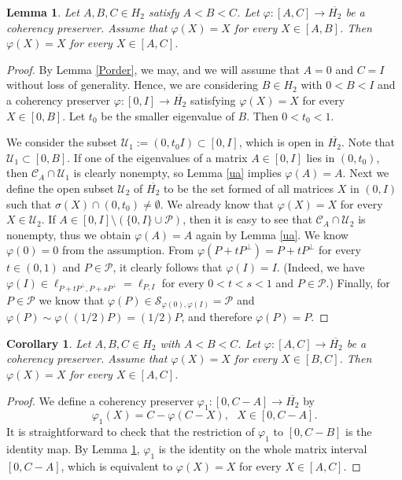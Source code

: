 \documentclass[10pt,a4paper]{amsart}
\newcommand\cP{{\mathcal{P}}}
\newcommand\oH{{\overline{H_2}}}
\newtheorem{lemma}[theorem]{Lemma}
\newtheorem{corollary}[theorem]{Corollary}
\theoremstyle{definition}
\theoremstyle{remark}
\numberwithin{subsection}{section}
\numberwithin{equation}{section}
\begin{document}
\begin{lemma}\label{smtq}
Let $A,B,C \in H_2$ satisfy $A < B < C$. Let $\varphi \colon [A,C ] \to \oH$ be a coherency preserver. Assume that $\varphi (X) = X$ for every $X \in [A,B]$. Then $\varphi (X) = X$ for every $X \in [A,C]$.
\end{lemma}
\begin{proof}
By Lemma \ref{Porder}, we may, and we will assume that $A=0$ and $C= I$ without loss of generality.
Hence, we are considering $B \in H_2$ with $0 < B <  I$ and a coherency preserver $\varphi \colon [0,I ] \to \oH$ satisfying $\varphi (X) = X$ for every $X \in [0,B]$.
Let $t_0$ be the smaller eigenvalue of $B$. Then $0 < t_0 <1$. 

We consider the subset $\mathcal{U}_1:=(0, t_0I)\subset [0, I]$, which is open in $\oH$. 
Note that $\mathcal{U}_1\subset [0,B]$.
If one of the eigenvalues of a matrix $A\in [0, I]$ lies in $(0, t_0)$, then $\mathcal{C}_A\cap \mathcal{U}_1$ is clearly nonempty, so Lemma \ref{ua} implies $\varphi(A)=A$. 
Next we define the open subset $\mathcal{U}_2$ of $\oH$ to be the set formed of all matrices $X$ in $(0, I)$ such that $\sigma(X)\cap (0, t_0)\neq \emptyset$.
We already know that $\varphi(X)=X$ for every $X\in \mathcal{U}_2$. 
If $A\in [0, I]\setminus (\{0, I\} \cup \mathcal{P})$, then it is easy to see that $\mathcal{C}_A\cap \mathcal{U}_2$ is nonempty, thus we obtain $\varphi(A)=A$ again by Lemma \ref{ua}.
We know $\varphi(0)=0$ from the assumption.
From $\varphi(P+tP^\perp)=P+tP^\perp$ for every $t\in (0, 1)$ and $P\in \mathcal{P}$,  it clearly follows that $\varphi(I)=I$. (Indeed, we have $\varphi(I)\in \ell_{P+tP^\perp, P+sP^\perp} = \ell_{P, I}$ for every $0<t<s<1$ and $P\in \cP$.) Finally, for $P \in \mathcal{P}$ we know that $\varphi (P) \in {\mathcal{S}}_{\varphi(0), \varphi(I)}= \mathcal{P}$ and $\varphi(P) \sim \varphi((1/2)P)=(1/2)P$, and therefore $\varphi (P) =P$.
\end{proof}

\begin{corollary}\label{smtq1}
Let $A,B,C \in H_2$ with $A < B < C$. Let $\varphi \colon [A,C ] \to \oH$ be a coherency preserver. Assume that $\varphi (X) = X$ for every $X \in [B,C]$. Then $\varphi (X) = X$ for every $X \in [A,C]$.
\end{corollary}

\begin{proof}
We define a coherency preserver $\varphi_1 \colon [0, C-A] \to \oH$ by
\[
\varphi_1 (X) = C - \varphi (C-X), \ \ \ X \in [0, C-A].
\]
It is straightforward to check that the restriction of $\varphi_1$ to $[0, C-B]$ is the identity map. By Lemma \ref{smtq}, $\varphi_1$ is the identity on the whole matrix interval $[0, C-A]$, which is equivalent to $\varphi (X) = X$ for every $X \in [A,C]$.
\end{proof}
\end{document}
